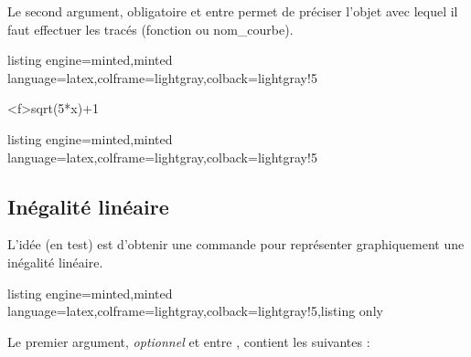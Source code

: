 \documentclass[11pt,a4paper]{ltxdoc}
\begin{document}
Le second argument, obligatoire et entre  permet de préciser l'objet avec lequel il faut effectuer les tracés (fonction ou nom\_courbe).

\begin{tcblisting}{listing engine=minted,minted language=latex,colframe=lightgray,colback=lightgray!5}
\begin{GraphiqueTikz}%
  [x=0.75cm,y=0.75cm,Xmin=0,Xmax=10,Xgrille=1,Xgrilles=0.5,
  Ymin=0,Ymax=8,Ygrille=1,Ygrilles=0.5]
  \DefinirCourbe[Couleur=red,Nom=cf,Debut=0,Fin=10,Trace]<f>{sqrt(5*x)+1}
\end{GraphiqueTikz}
\end{tcblisting}

\begin{tcblisting}{listing engine=minted,minted language=latex,colframe=lightgray,colback=lightgray!5}
\begin{GraphiqueTikz}[x=4cm,y=3cm,Xmin=0,Xmax=2.5,Xgrille=1,Xgrilles=0.25,
  Ymin=0,Ymax=1.25,Ygrille=0.5,Ygrilles=0.25]
\end{GraphiqueTikz}
\end{tcblisting}

\pagebreak

\subsection{Inégalité linéaire}\label{ineglin}

L'idée (en test) est d'obtenir une commande pour représenter graphiquement une inégalité linéaire.

\begin{tcblisting}{listing engine=minted,minted language=latex,colframe=lightgray,colback=lightgray!5,listing only}
\end{tcblisting}

Le premier argument, \textit{optionnel} et entre \MontreCode{[...]}, contient les  suivantes :
\end{document}
